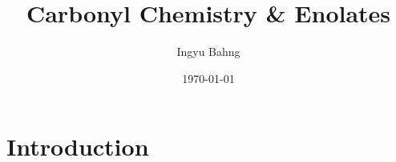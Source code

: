 \documentclass[10pt]{article}
\title{Carbonyl Chemistry \& Enolates}
\date{\today}
\author{Ingyu Bahng}
\begin{document}


\section{Introduction}
\end{document}
